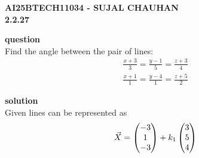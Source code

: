 \documentclass[12pt]{article}
\begin{document}
    

\begin{center}
\textbf{\Large AI25BTECH11034 - SUJAL CHAUHAN }\\
\textbf {2.2.27}
\end{center}

\textbf{question}\\
Find the angle between the pair of lines:\\
\begin{align*}
    \frac{x+3}{3}=\frac{y-1}{5}=\frac{z+3}{4}
\end{align*}
\begin{align*}
    \frac{x+1}{1}=\frac{y-4}{1}=\frac{z+5}{2}
\end{align*}

\textbf{solution}\\
Given lines can be represented as \\
\begin{align}
    \Vec{X}= \begin{pmatrix}-3 \\ 1 \\-3\end{pmatrix} + k_1\begin{pmatrix}3 \\ 5 \\4\end{pmatrix}    
\end{align}
\end{document}
